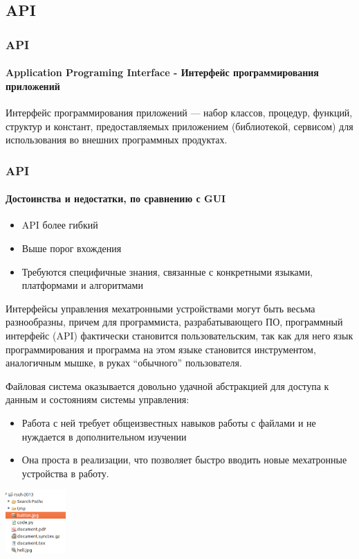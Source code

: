 \documentclass{beamer}
\begin{document}
\subsection{API}
\begin{frame}
\frametitle{API}
\framesubtitle{Application Programing
Interface - Интерфейс программирования приложений}
Интерфейс программирования приложений — набор  классов, процедур, функций, структур и 
констант, предоставляемых приложением (библиотекой, сервисом) для использования 
во внешних программных продуктах. 

\end{frame}

\begin{frame}
\frametitle{API}
\framesubtitle{Достоинства и недостатки, по сравнению с GUI}
\begin{itemize}
  \item<1> API более гибкий
  \item<2> Выше порог вхождения
  \item<2> Требуются специфичные знания, связанные с конкретными языками,
  платформами и алгоритмами
\end{itemize}

Интерфейсы управления мехатронными устройствами могут быть весьма разнообразны,
причем для программиста, разрабатывающего ПО, программный интерфейс 
(API) фактически становится пользовательским, 
так как для него язык программирования и программа на этом языке становится
инструментом, аналогичным мышке, в руках “обычного” пользователя.
\end{frame}


\begin{frame}
Файловая система оказывается довольно удачной абстракцией для доступа к данным и
состояниям системы управления:
\begin{itemize}
  \item<1> Работа с ней требует общеизвестных навыков работы с файлами и не
  нуждается в дополнительном изучении
  \item<1> Она проста в реализации, что позволяет быстро вводить новые
  мехатронные устройства в работу.
 
\end{itemize}
\includegraphics[width=2.3cm]{file.png}
\end{frame}
\end{document}
